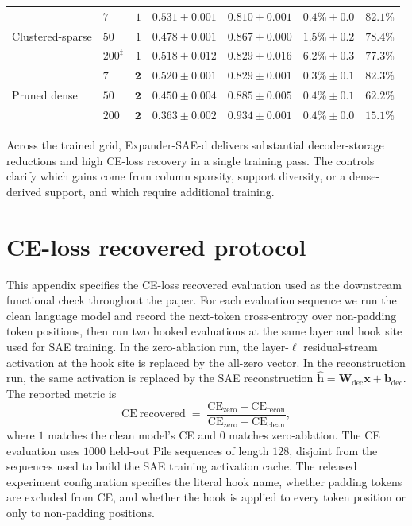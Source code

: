 \documentclass{article}
\theoremstyle{plain}
\theoremstyle{definition}
\theoremstyle{remark}
\begin{document}
\begin{table}[h]
\begin{tabular}{llrrrrr}
        \midrule
        \multirow{3}{*}{Clustered-sparse}
                                 & $7$         & $1$          & $0.531{\pm}0.001$ & $0.810{\pm}0.001$ & $0.4\%{\pm}0.0$  & $82.1\%$          \\
                                 & $50$        & $1$          & $0.478{\pm}0.001$ & $0.867{\pm}0.000$ & $1.5\%{\pm}0.2$  & $78.4\%$          \\
                                 & $200^\ddagger$ & $1$       & $0.518{\pm}0.012$ & $0.829{\pm}0.016$ & $\mathbf{6.2\%{\pm}0.3}$ & $77.3\%$ \\
        \midrule
        \multirow{3}{*}{Pruned dense}
                                 & $7$         & $\mathbf{2}$ & $0.520{\pm}0.001$ & $0.829{\pm}0.001$ & $0.3\%{\pm}0.1$  & $82.3\%$          \\
                                 & $50$        & $\mathbf{2}$ & $0.450{\pm}0.004$ & $0.885{\pm}0.005$ & $0.4\%{\pm}0.1$  & $62.2\%$          \\
                                 & $200$       & $\mathbf{2}$ & $0.363{\pm}0.002$ & $0.934{\pm}0.001$ & $0.4\%{\pm}0.0$  & $15.1\%$          \\
        \bottomrule
    \end{tabular}
\end{table}

Across the trained grid, Expander-SAE-d delivers substantial decoder-storage reductions and high CE-loss recovery in a single training pass. The controls clarify which gains come from column sparsity, support diversity, or a dense-derived support, and which require additional training.


\section{CE-loss recovered protocol}
\label{app:ce_protocol}

This appendix specifies the CE-loss recovered evaluation used as the downstream functional check throughout the paper. For each evaluation sequence we run the clean language model and record the next-token cross-entropy over non-padding token positions, then run two hooked evaluations at the same layer and hook site used for SAE training. In the zero-ablation run, the layer-$\ell$ residual-stream activation at the hook site is replaced by the all-zero vector. In the reconstruction run, the same activation is replaced by the SAE reconstruction $\hat{\mathbf{h}} = \mathbf{W}_{\mathrm{dec}}\mathbf{x} + \mathbf{b}_{\mathrm{dec}}$. The reported metric is
\[
    \mathrm{CE\ recovered}
    \;=\;
    \frac{
        \mathrm{CE}_{\mathrm{zero}} - \mathrm{CE}_{\mathrm{recon}}
    }{
        \mathrm{CE}_{\mathrm{zero}} - \mathrm{CE}_{\mathrm{clean}}
    },
\]
where $1$ matches the clean model's CE and $0$ matches zero-ablation. The CE evaluation uses $1000$ held-out Pile sequences of length $128$, disjoint from the sequences used to build the SAE training activation cache. The released experiment configuration specifies the literal hook name, whether padding tokens are excluded from CE, and whether the hook is applied to every token position or only to non-padding positions.
\end{document}

